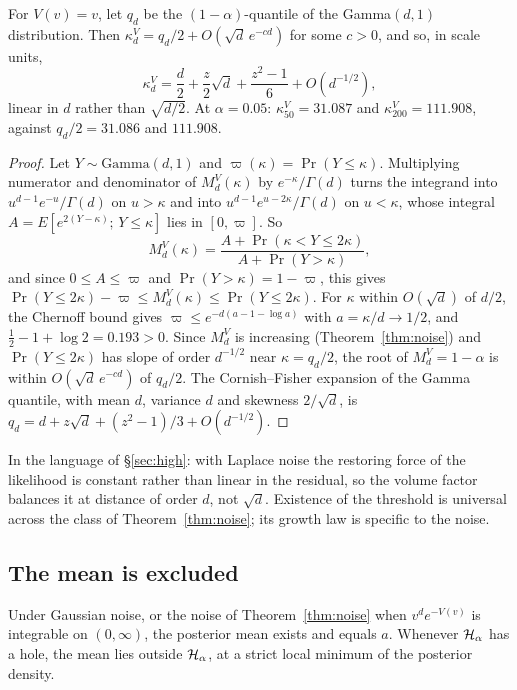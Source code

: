 \begin{proposition}\label{prop:laplace}
For $V(v) = v$, let $q_d$ be the $(1-\alpha)$-quantile of the Gamma$(d,1)$ distribution. Then
$\kappa_d^V = q_d/2 + O(\sqrt d\,e^{-cd})$ for some $c > 0$, and so, in scale units,
\[ \kappa_d^V = \frac d2 + \frac z2\sqrt d + \frac{z^2 - 1}{6} + O(d^{-1/2}), \]
linear in $d$ rather than $\sqrt{d/2}$. At $\alpha = 0.05$: $\kappa_{50}^V = 31.087$ and $\kappa_{200}^V = 111.908$, against
$q_d/2 = 31.086$ and $111.908$.
\end{proposition}

\begin{proof}
Let $Y \sim \mathrm{Gamma}(d, 1)$ and $\varpi(\kappa) = \Pr(Y \le \kappa)$. Multiplying numerator and denominator of
$M_d^V(\kappa)$ by $e^{-\kappa}/\Gamma(d)$ turns the integrand into $u^{d-1}e^{-u}/\Gamma(d)$ on $u > \kappa$ and into
$u^{d-1}e^{u - 2\kappa}/\Gamma(d)$ on $u < \kappa$, whose integral $A = E[e^{2(Y-\kappa)};\, Y \le \kappa]$ lies in $[0, \varpi]$. So
\[ M_d^V(\kappa) = \frac{A + \Pr(\kappa < Y \le 2\kappa)}{A + \Pr(Y > \kappa)}, \]
and since $0 \le A \le \varpi$ and $\Pr(Y > \kappa) = 1 - \varpi$, this gives
$\Pr(Y \le 2\kappa) - \varpi \le M_d^V(\kappa) \le \Pr(Y \le 2\kappa)$. For $\kappa$ within $O(\sqrt d)$ of $d/2$, the Chernoff bound gives
$\varpi \le e^{-d(a - 1 - \log a)}$ with $a = \kappa/d \to 1/2$, and $\tfrac12 - 1 + \log 2 = 0.193 > 0$. Since $M_d^V$ is
increasing (Theorem~\ref{thm:noise}) and $\Pr(Y \le 2\kappa)$ has slope of order $d^{-1/2}$ near $\kappa = q_d/2$, the root of
$M_d^V = 1 - \alpha$ is within $O(\sqrt d\,e^{-cd})$ of $q_d/2$. The Cornish--Fisher expansion \citep{cornish1938} of the Gamma quantile, with mean
$d$, variance $d$ and skewness $2/\sqrt d$, is $q_d = d + z\sqrt d + (z^2 - 1)/3 + O(d^{-1/2})$.
\end{proof}

In the language of \S\ref{sec:high}: with Laplace noise the restoring force of the likelihood is constant rather than
linear in the residual, so the volume factor balances it at distance of order $d$, not $\sqrt d$. Existence of the
threshold is universal across the class of Theorem~\ref{thm:noise}; its growth law is specific to the noise.

\subsection{The mean is excluded}\label{sec:mean}

\begin{corollary}\label{cor:mean}
Under Gaussian noise, or the noise of Theorem~\ref{thm:noise} when $v^d e^{-V(v)}$ is integrable on $(0, \infty)$,
the posterior mean exists and equals $a$. Whenever $\mathcal{H}_\alpha$ has a hole, the mean lies outside $\mathcal{H}_\alpha$, at a strict local
minimum of the posterior density.
\end{corollary}

